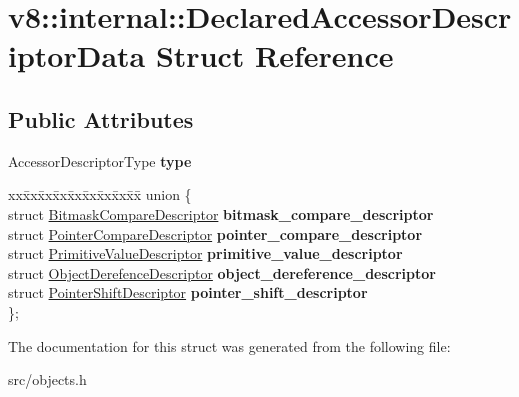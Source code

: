 \hypertarget{structv8_1_1internal_1_1_declared_accessor_descriptor_data}{}\section{v8\+:\+:internal\+:\+:Declared\+Accessor\+Descriptor\+Data Struct Reference}
\label{structv8_1_1internal_1_1_declared_accessor_descriptor_data}
\subsection*{Public Attributes}
\begin{DoxyCompactItemize}
\item 
\hypertarget{structv8_1_1internal_1_1_declared_accessor_descriptor_data_a7fa9ca3aab013cb7a3d2f372fa4b2f1f}{}Accessor\+Descriptor\+Type {\bfseries type}\label{structv8_1_1internal_1_1_declared_accessor_descriptor_data_a7fa9ca3aab013cb7a3d2f372fa4b2f1f}

\item 
\hypertarget{structv8_1_1internal_1_1_declared_accessor_descriptor_data_ae2ff5c2ed8442879f5947f9d41fedd40}{}\begin{tabbing}
xx\=xx\=xx\=xx\=xx\=xx\=xx\=xx\=xx\=\kill
union \{\\
\>struct \hyperlink{structv8_1_1internal_1_1_bitmask_compare_descriptor}{BitmaskCompareDescriptor} {\bfseries bitmask\_compare\_descriptor}\\
\>struct \hyperlink{structv8_1_1internal_1_1_pointer_compare_descriptor}{PointerCompareDescriptor} {\bfseries pointer\_compare\_descriptor}\\
\>struct \hyperlink{structv8_1_1internal_1_1_primitive_value_descriptor}{PrimitiveValueDescriptor} {\bfseries primitive\_value\_descriptor}\\
\>struct \hyperlink{structv8_1_1internal_1_1_object_derefence_descriptor}{ObjectDerefenceDescriptor} {\bfseries object\_dereference\_descriptor}\\
\>struct \hyperlink{structv8_1_1internal_1_1_pointer_shift_descriptor}{PointerShiftDescriptor} {\bfseries pointer\_shift\_descriptor}\\
\}; \label{structv8_1_1internal_1_1_declared_accessor_descriptor_data_ae2ff5c2ed8442879f5947f9d41fedd40}
\\

\end{tabbing}\end{DoxyCompactItemize}


The documentation for this struct was generated from the following file\+:\begin{DoxyCompactItemize}
\item 
src/objects.\+h\end{DoxyCompactItemize}
